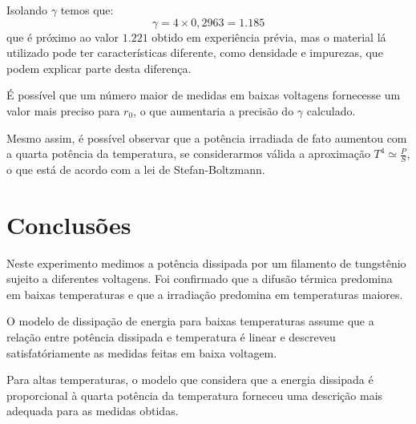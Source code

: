 \documentclass[brazilian,12pt,a4paper,final]{article}
\begin{document}
Isolando $\gamma$ temos que:
$$\gamma=4\times 0,2963=1.185$$
que é próximo ao valor $1.221$ obtido em experiência prévia,
mas o material lá utilizado pode ter características diferente,
como densidade e impurezas, que podem explicar parte desta diferença.

É possível que um número maior de medidas em baixas voltagens fornecesse
um valor mais preciso para $r_0$, o que aumentaria a precisão do $\gamma$
calculado.

Mesmo assim, é possível observar que a potência irradiada de fato aumentou
com a quarta potência da temperatura, se considerarmos válida a aproximação
$T^4\simeq \frac{P}{S}$, o que está de acordo com a lei de Stefan-Boltzmann.

\section{Conclusões}
Neste experimento medimos a potência dissipada por um filamento de tungstênio
sujeito a diferentes voltagens. Foi confirmado que a difusão térmica predomina
em baixas temperaturas e que a irradiação predomina em temperaturas maiores.

O modelo de dissipação de energia para baixas temperaturas
assume que a relação entre potência dissipada e temperatura é linear
e descreveu satisfatóriamente as medidas feitas em baixa voltagem.

Para altas temperaturas, 
o modelo que considera que 
a energia dissipada é proporcional à quarta potência da temperatura 
forneceu uma descrição mais adequada para as medidas obtidas.




\end{document}
